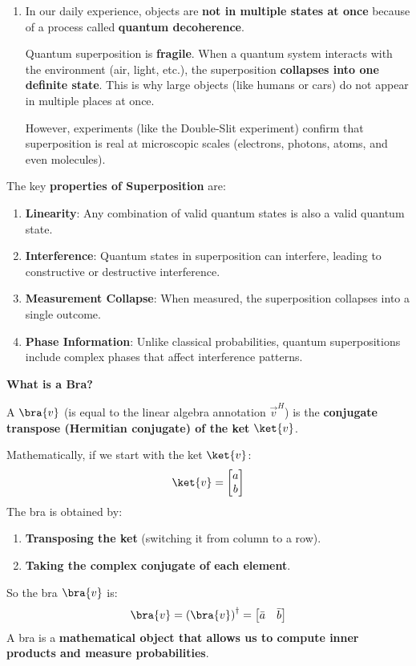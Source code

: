\begin{enumerate}
  
  \item {} In our daily experience, objects are \textbf{not in multiple states at once} because of a process called \textbf{quantum decoherence}.

  Quantum superposition is \textbf{fragile}. When a quantum system interacts with the environment (air, light, etc.), the superposition \textbf{collapses into one definite state}. This is why large objects (like humans or cars) do not appear in multiple places at once.
  
  However, experiments (like the Double-Slit experiment) confirm that superposition is real at microscopic scales (electrons, photons, atoms, and even molecules).
\end{enumerate}

\newpage

\noindent
The key \textbf{properties of Superposition} are:
\begin{enumerate}
    \item \textbf{Linearity}: Any combination of valid quantum states is also a valid quantum state.
    \item \textbf{Interference}: Quantum states in superposition can interfere, leading to constructive or destructive interference.
    \item \textbf{Measurement Collapse}: When measured, the superposition collapses into a single outcome.
    \item \textbf{Phase Information}: Unlike classical probabilities, quantum superpositions include complex phases that affect interference patterns.
\end{enumerate}

\begin{flushleft}
    \textcolor{Green3}{ \textbf{What is a Bra?}}
\end{flushleft}
A  $\bra{v}$ (is equal to the linear algebra annotation $\overrightarrow{v}^{H}$) is the \textbf{conjugate transpose (Hermitian conjugate) of the ket} $\ket{v}$.

\highspace
Mathematically, if we start with the ket $\ket{v}$:
\begin{equation*}
    \ket{v} = \begin{bmatrix}
        a \\ b
    \end{bmatrix}
\end{equation*}
The bra is obtained by:
\begin{enumerate}
    \item \textbf{Transposing the ket} (switching it from column to a row).
    \item \textbf{Taking the complex conjugate of each element}.
\end{enumerate}
So the bra $\bra{v}$ is:
\begin{equation*}
    \bra{v} = \left(\bra{v}\right)^{\dagger} = \begin{bmatrix}
        \bar{a} & \bar{b}
    \end{bmatrix}
\end{equation*}
A bra is a \textbf{mathematical object that allows us to compute inner products and measure probabilities}.

